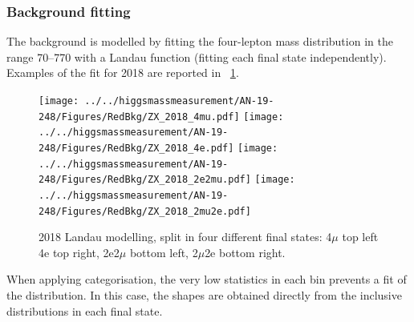 \subsubsection{Background fitting}
The background is modelled by fitting the four-lepton mass distribution in the range 70--770\GeV
with a Landau function (fitting each final state independently).
Examples of the fit for 2018 are reported in \figurename~\ref{ZX_models_2018}.
\begin{figure}[!htbp]
	\begin{center}
		\texttt{[image: ../../higgsmassmeasurement/AN-19-248/Figures/RedBkg/ZX\_2018\_4mu.pdf]}
		\texttt{[image: ../../higgsmassmeasurement/AN-19-248/Figures/RedBkg/ZX\_2018\_4e.pdf]}
		\texttt{[image: ../../higgsmassmeasurement/AN-19-248/Figures/RedBkg/ZX\_2018\_2e2mu.pdf]}
		\texttt{[image: ../../higgsmassmeasurement/AN-19-248/Figures/RedBkg/ZX\_2018\_2mu2e.pdf]}
		\caption{2018 \ZplusX Landau modelling, split in four different final states:
		4$\mu$ top left 4e top right, 2e2$\mu$ bottom left, 2$\mu$2e bottom right.}
		\label{ZX_models_2018}
	\end{center}
\end{figure}
When applying categorisation, the very low statistics in each bin prevents a fit of the distribution.
In this case, the shapes are obtained directly from the inclusive distributions in each final state.




